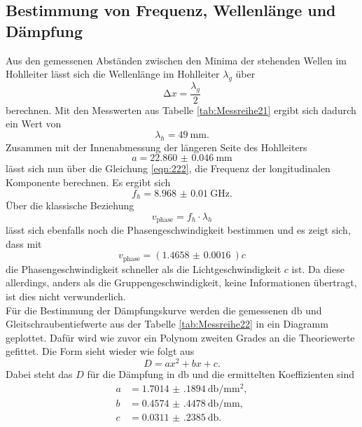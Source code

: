 \subsection{Bestimmung von Frequenz, Wellenlänge und Dämpfung}

Aus den gemessenen Abständen zwischen den Minima der stehenden Wellen im Hohlleiter lässt sich die Wellenlänge im Hohlleiter $\lambda_g$ über
\begin{equation}
\increment x = \frac{\lambda_g}{2}
\end{equation}
berechnen. Mit den Messwerten aus Tabelle \ref{tab:Messreihe21} ergibt sich dadurch ein Wert von
\begin{equation}
\lambda_h = \SI{49}{\milli\meter}.
\end{equation}
Zusammen mit der Innenabmessung der längeren Seite des Hohlleiters
\begin{equation}
a = \SI{22.860(46)}{\milli\meter}
\end{equation}
lässt sich nun über die Gleichung \ref{eqn:222}, die Frequenz der longitudinalen Komponente berechnen.
Es ergibt sich 
\begin{equation}
f_h = \SI{8.968(10)}{\giga\hertz}.
\end{equation}
Über die klassische Beziehung 
\begin{equation}
v_{\text{phase}} = f_h \cdot \lambda_h
\end{equation}
lässt sich ebenfalls noch die Phasengeschwindigkeit bestimmen und es zeigt sich, dass mit 
\begin{equation}
v_{\text{phase}} = \left(\SI{1.4658(16)}{}\right) c
\end{equation}
die Phasengeschwindigkeit schneller als die Lichtgeschwindigkeit $c$ ist. Da diese allerdings, anders als die Gruppengeschwindigkeit, keine Informationen übertragt, ist dies nicht verwunderlich.
\\
\newline
Für die Bestimmung der Dämpfungskurve werden die gemessenen $\si{\decibel}$ und Gleitschraubentiefwerte aus der Tabelle \ref{tab:Messreihe22} in ein Diagramm geplottet.
Dafür wird wie zuvor ein Polynom zweiten Grades an die Theoriewerte gefittet. Die Form sieht wieder wie folgt aus
\begin{equation}
D = ax^2 + bx + c.
\end{equation}
Dabei steht das $D$ für die Dämpfung in $\si{\decibel}$ und die ermittelten Koeffizienten sind
\begin{align*}
a &= \SI{1.7014(1894)}{\decibel\per\milli\meter\squared}, \\
b &= \SI{0.4574(4478)}{\decibel\per\milli\meter}, \\
c &= \SI{0.0311(2385)}{\decibel}.
\end{align*}
